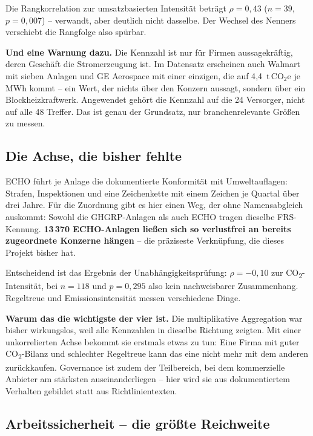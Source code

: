 \documentclass[11pt,a4paper]{article}
\newcommand{\tco}{\ensuremath{\mathrm{t\,CO}_{2}\mathrm{e}}}
\newcommand{\befund}[1]{%
  \par\vspace{2pt}\noindent\colorbox{softgrey}{%
  \begin{minipage}{\dimexpr\linewidth-2\fboxsep}\small\vspace{3pt}#1\vspace{3pt}\end{minipage}}\par\vspace{4pt}}
\begin{document}
Die Rangkorrelation zur umsatzbasierten Intensität beträgt $\rho = 0{,}43$ ($n = 39$, $p = 0{,}007$) -- verwandt, aber deutlich nicht dasselbe. Der Wechsel des Nenners verschiebt die Rangfolge also spürbar.

\befund{\textbf{Und eine Warnung dazu.} Die Kennzahl ist nur für Firmen aussagekräftig, deren Geschäft die Stromerzeugung ist. Im Datensatz erscheinen auch Walmart mit sieben Anlagen und GE Aerospace mit einer einzigen, die auf 4{,}4~\tco{} je MWh kommt -- ein Wert, der nichts über den Konzern aussagt, sondern über ein Blockheizkraftwerk. Angewendet gehört die Kennzahl auf die 24 Versorger, nicht auf alle 48 Treffer. Das ist genau der Grundsatz, nur branchenrelevante Größen zu messen.}

\subsection{Die Achse, die bisher fehlte}

ECHO führt je Anlage die dokumentierte Konformität mit Umweltauflagen: Strafen, Inspektionen und eine Zeichenkette mit einem Zeichen je Quartal über drei Jahre. Für die Zuordnung gibt es hier einen Weg, der ohne Namensabgleich auskommt: Sowohl die GHGRP-Anlagen als auch ECHO tragen dieselbe FRS-Kennung. \textbf{13\,370 ECHO-Anlagen ließen sich so verlustfrei an bereits zugeordnete Konzerne hängen} -- die präziseste Verknüpfung, die dieses Projekt bisher hat.

Entscheidend ist das Ergebnis der Unabhängigkeitsprüfung: $\rho = -0{,}10$ zur CO\textsubscript{2}-Intensität, bei $n = 118$ und $p = 0{,}295$ also kein nachweisbarer Zusammenhang. Regeltreue und Emissionsintensität messen verschiedene Dinge.

\befund{\textbf{Warum das die wichtigste der vier ist.} Die multiplikative Aggregation war bisher wirkungslos, weil alle Kennzahlen in dieselbe Richtung zeigten. Mit einer unkorrelierten Achse bekommt sie erstmals etwas zu tun: Eine Firma mit guter CO\textsubscript{2}-Bilanz und schlechter Regeltreue kann das eine nicht mehr mit dem anderen zurückkaufen. Governance ist zudem der Teilbereich, bei dem kommerzielle Anbieter am stärksten auseinanderliegen -- hier wird sie aus dokumentiertem Verhalten gebildet statt aus Richtlinientexten.}

\subsection{Arbeitssicherheit -- die größte Reichweite}
\end{document}
